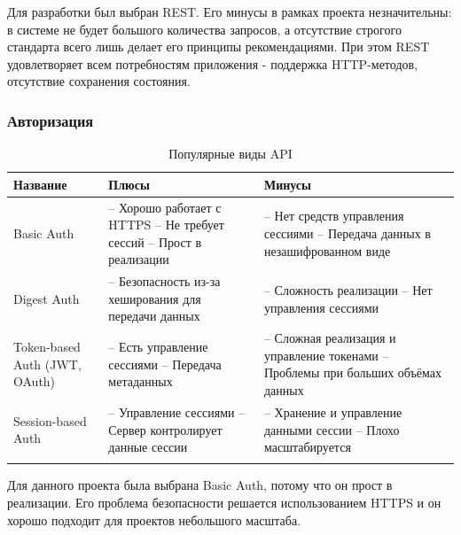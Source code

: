 \documentclass[a4paper,article]{article}
\begin{document}
    Для разработки был выбран REST. Его минусы в рамках проекта незначительны: в системе не будет большого количества запросов, а отсутствие строгого стандарта всего лишь делает его принципы рекомендациями. При этом REST удовлетворяет всем потребностям приложения - поддержка HTTP-методов, отсутствие сохранения состояния.

    \subsubsection{Авторизация}

    \begin{xltabular}{\textwidth} { |
            >{\hsize} X |
            >{\hsize} X |
            >{\hsize} X | }
        \hline
        Название & Плюсы & Минусы \\
        \hline
        Basic Auth
        & -- Хорошо работает с HTTPS \newline -- Не требует сессий \newline -- Прост в реализации
        & -- Нет средств управления сессиями \newline -- Передача данных в незашифрованном виде \\
        \hline
        Digest Auth
        & -- Безопасность из-за хеширования для передачи данных
        & -- Сложность реализации \newline -- Нет управления сессиями \\
        \hline
        Token-based Auth \newline (JWT, OAuth)
        & -- Есть управление сессиями \newline -- Передача метаданных
        & -- Сложная реализация и управление токенами \newline -- Проблемы при больших объёмах данных \\
        \hline
        Session-based Auth
        & -- Управление сессиями \newline -- Сервер контролирует данные сессии
        & -- Хранение и управление данными сессии \newline -- Плохо масштабируется \\
        \hline

        \caption{\centering Популярные виды API}

        \label{tab:Популярные виды API}
    \end{xltabular}

    Для данного проекта была выбрана Basic Auth, потому что он прост в реализации. Его проблема безопасности решается использованием HTTPS и он хорошо подходит для проектов небольшого масштаба.
\end{document}
